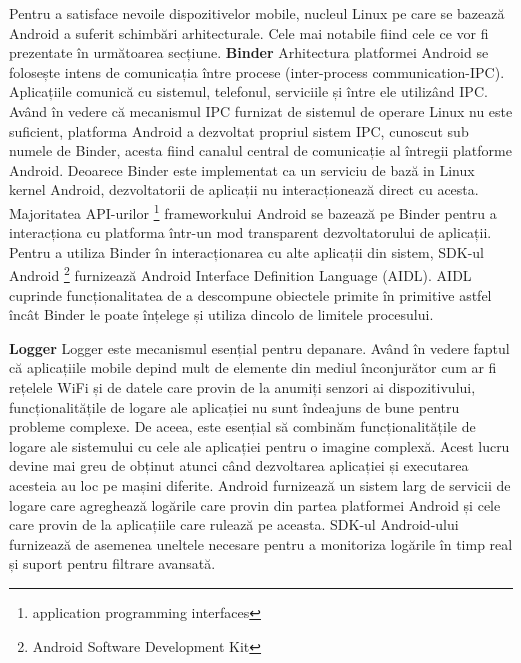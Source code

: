  Pentru a satisface nevoile dispozitivelor mobile, nucleul Linux pe care se bazează Android a suferit schimbări arhitecturale. Cele mai notabile fiind cele ce vor fi prezentate în următoarea secțiune.\newline
\newpage
\textbf{Binder}\newline
Arhitectura platformei Android se folosește intens de comunicația între procese (inter-process communication-IPC). Aplicațiile comunică cu sistemul, telefonul, serviciile și între ele utilizând IPC. Având în vedere că mecanismul IPC furnizat de sistemul de operare Linux nu este suficient, platforma Android a dezvoltat propriul sistem IPC, cunoscut sub numele de Binder, acesta fiind canalul central de comunicație al întregii platforme Android.\newline 
Deoarece Binder este implementat ca un serviciu de bază in Linux kernel Android, dezvoltatorii de aplicații nu interacționează direct cu acesta. Majoritatea API-urilor \footnote{application programming interfaces } frameworkului Android se bazează pe Binder pentru a interacționa cu platforma într-un mod transparent dezvoltatorului de aplicații.\newline
 Pentru a utiliza Binder în interacționarea cu alte aplicații din sistem, SDK-ul Android \footnote{Android Software Development Kit } furnizează  Android Interface Definition Language (AIDL).  AIDL cuprinde funcționalitatea de a descompune obiectele primite în primitive astfel încât Binder le poate înțelege și utiliza dincolo de limitele procesului.\cite{2}\newline

\textbf{Logger}\newline
Logger este mecanismul esențial pentru depanare. Având în vedere faptul că aplicațiile mobile depind mult de elemente din mediul înconjurător cum ar fi rețelele WiFi și de datele care provin de la anumiți senzori ai dispozitivului, funcționalitățile de logare ale aplicației nu sunt îndeajuns de bune pentru probleme complexe. De aceea, este esențial să combinăm funcționalitățile de logare ale sistemului cu cele ale aplicației pentru o imagine complexă.\newline 
Acest lucru devine mai greu de obținut atunci când dezvoltarea aplicației și executarea acesteia au loc pe mașini diferite.\newline
Android furnizează un sistem larg de servicii de logare care agreghează logările care provin din partea platformei Android și cele care provin de la aplicațiile care rulează pe aceasta.\newline 
SDK-ul Android-ului furnizează de asemenea uneltele necesare pentru a monitoriza logările în timp real și suport pentru filtrare avansată.\cite{2}\newline


